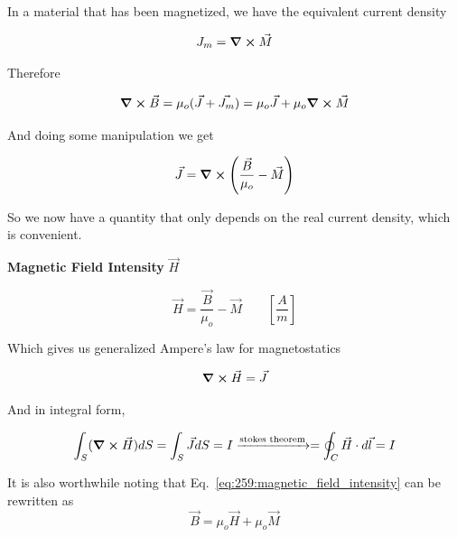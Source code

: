 \documentclass[10pt]{article}
\begin{document}
In a material that has been magnetized, we have the equivalent current density

\begin{equation}
	J_m = \curl \vec{M} 
	\label{eq:259:equivalent_magnetic_current_density}
\end{equation}

Therefore 

\begin{equation}
	\curl{\vec{B}} = \mu_o (\vec{J} + \vec{J_m}) = \mu_o \vec{J} + \mu_o \curl{\vec{M}}
\end{equation}

And doing some manipulation we get 

\begin{equation}
	\vec{J} = \curl{ \left( \frac{\vec{B}}{\mu_o} - \vec{M} \right)   }
\end{equation}

So we now have a quantity that only depends on the real current density, which is convenient.

\begin{definition}
	\textbf{Magnetic Field Intensity} $\vec{H} $

	\begin{equation}
		\vec{H} = \frac{\vec{B}}{\mu_o} - \vec{M} \qquad \left[ \frac{A}{m} \right] 
		 \label{eq:259:magnetic_field_intensity}
	\end{equation}

	Which gives us generalized Ampere's law for magnetostatics

	\begin{equation}
		\curl{\vec{H}} = \vec{J} 
		\label{eq:259:generalized_ampere_diff}
	\end{equation}

	And in integral form,

	\begin{equation}
		\int_S (\curl{\vec{H}}) dS = \int_S \vec{J} dS = I \xrightarrow{\text{stokes theorem}} = \oint_C \vec{H} \cdot d \vec{l} = I
		\label{eq:259:generalized_ampere_int}
	\end{equation}

\end{definition}


It is also worthwhile noting that Eq.~\ref{eq:259:magnetic_field_intensity} can be rewritten as
\begin{equation}
	\vec{B} = \mu_o \vec{H} + \mu_o \vec{M}
\end{equation}
\end{document}
